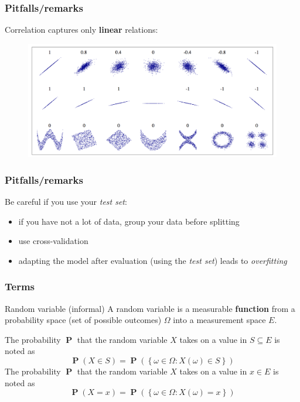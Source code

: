 \documentclass[aspectratio=169]{beamer}
\DeclareMathOperator*{\Prob}{\mathbf{P}}
\begin{document}
	\begin{frame}
		\frametitle{Pitfalls/remarks}
		Correlation captures only \textbf{linear} relations:
		\begin{figure}
			\includegraphics[width=\textwidth]{./../figs/correlations.png}
		\end{figure}
	\end{frame}
	
	\begin{frame}
		\frametitle{Pitfalls/remarks}
		Be careful if you use your \textit{test set}:
		\begin{itemize}
			\item if you have not a lot of data, group your data before splitting
			\item use cross-validation
			\item adapting the model after evaluation (using the \textit{test set}) leads to \textit{overfitting}
		\end{itemize}
	\end{frame}

	\begin{frame}
		\frametitle{Terms}
		\begin{block}{Random variable (informal)}
		A random variable is a measurable \textbf{function} from a probability space (set of possible outcomes) $\Omega$ into a measurement space $E$.
		\end{block}
		\vspace{0.5cm}
		The probability $\Prob$ that the random variable $X$ takes on a value in $S \subseteq E$ is noted as
		\begin{equation*}
			\Prob(X \in S) = \Prob(\left\{ \omega \in \Omega : X(\omega) \in S \right\})
		\end{equation*}
		The probability $\Prob$ that the random variable $X$ takes on a value in $x \in E$ is noted as
		\begin{equation*}
			\Prob(X = x) = \Prob(\left\{ \omega \in \Omega : X(\omega) = x \right\})
		\end{equation*}
	\end{frame}
\end{document}
